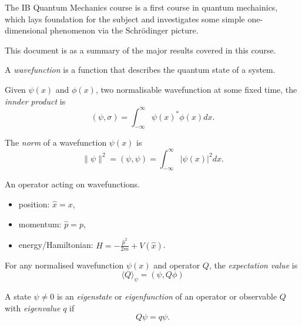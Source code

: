 \documentclass[a4paper]{article}
\theoremstyle{definition}
\begin{document}
\maketitle

The IB Quantum Mechanics course is a first course in quantum mechainics, which lays foundation for the subject and investigates some simple one-dimensional phenomenon via the Schr\"odinger picture.

This document is as a summary of the major results covered in this course.

\begin{defi}[Wavefunction]
  A \emph{wavefunction} is a function that describes the quantum state of a system.
\end{defi}

\begin{defi}
  Given \(\psi(x)\) and \(\phi(x)\), two normalisable wavefunction at some fixed time, the \emph{innder product} is
  \[
(\psi, \sigma) = \int_{-\infty}^{\infty} \psi(x)^*\phi(x) dx.
  \]
\end{defi}

\begin{defi}[Norm]
  The \emph{norm} of a wavefunction \(\psi(x)\) is
  \[
    \|\psi\|^2 = (\psi,\psi) = \int_{-\infty}^{\infty} |\psi(x)|^2 dx. 
  \]
\end{defi}
\begin{defi}
  An operator acting on wavefunctions.
\end{defi}

\begin{itemize}
\item position: \(\hat x = x\),
\item momentum: \(\hat p = p\),
\item energy/Hamiltonian: \(H = -\frac{\hat p^2}{2m} + V(\hat x)\).
\end{itemize}

\begin{defi}
  For any normalised wavefunction \(\psi(x)\) and operator \(Q\), the \emph{expectation value} is
  \[
  \langle Q\rangle_\psi = (\psi, Q\phi)
\]

\end{defi}

\begin{defi}
  A state \(\psi \neq 0\) is an \emph{eigenstate} or \emph{eigenfunction} of an operator or observable \(Q\) with \emph{eigenvalue} \(q\) if
  \[
Q\psi = q\psi.
  \]
\end{defi}
\end{document}
